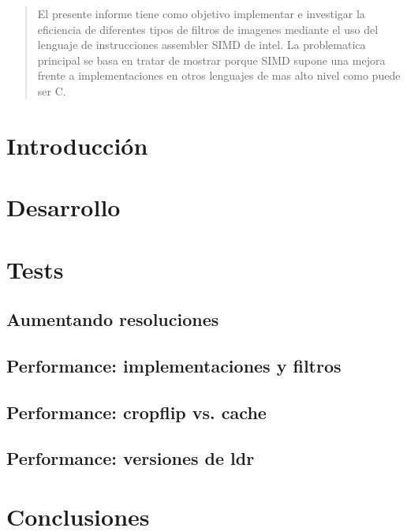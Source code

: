 \documentclass[a4paper]{article}
\begin{document}
\thispagestyle{empty}

\maketitle
\newpage

\thispagestyle{empty}
\vfill
\begin{abstract}
El presente informe tiene como objetivo implementar e investigar la eficiencia de diferentes tipos de filtros de imagenes mediante el uso del lenguaje de instrucciones assembler SIMD de intel. 
La problematica principal se basa en tratar de mostrar porque SIMD supone una mejora frente a implementaciones en otros lenguajes de mas alto nivel como puede ser C. 
\end{abstract}

\thispagestyle{empty}
\vspace{3cm}
\tableofcontents
\newpage


\newpage

\section{Introducción}


\section{Desarrollo}


\section{Tests}

\subsection{Aumentando resoluciones}

\newpage

\subsection{Performance: implementaciones y filtros}

\newpage

\subsection{Performance: cropflip vs. cache}

\newpage

\subsection{Performance: versiones de ldr}

\newpage

\section{Conclusiones}

\end{document}
